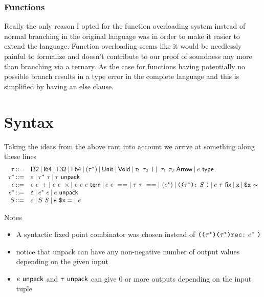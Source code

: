 \documentclass{article}
\begin{document}
\subsubsection{Functions}
Really the only reason I opted for the function overloading system instead of normal branching in the original language was in order to make it easier to extend the language.
Function overloading seems like it would be needlessly painful to formalize and doesn't contribute to our proof of soundness any more than branching via a ternary. As the case for functions having potentially no possible branch results in a type error in the complete language and this is simplified by having an else clause.

\section{Syntax}
Taking the ideas from the above rant into account we arrive at something along these lines
\[
\begin{array}{r l}
    \tau \mathop{::=} & \mathsf{I32} \mathbin{|} \mathsf{I64} \mathbin{|} \mathsf{F32} \mathbin{|} \mathsf{F64} \mathbin{|} 
        (\tau^*) \mathbin{|} \mathsf{Unit} \mathbin{|} \mathsf{Void} \mathbin{|} \tau_1~ \tau_2~ \texttt{|} 
        \mathbin{|} ~ \tau_1 ~ \tau_2 ~ \mathsf{Arrow} \mathbin{|} e ~ \mathsf{type}\\
        
    \tau^* \mathop{::=} & \varepsilon \mathbin{|} \tau^* ~ \tau \mathbin{|} \tau ~ \mathsf{unpack}\\

    e \mathop{::=} & e~e~+ \mathbin{|} ~e~e~\times \mathbin{|} ~ e ~ e ~ e ~ \mathsf{tern} 
        \mathbin{|} e~e~== \mathbin{|} ~ \tau~ \tau~ ==
        \mathbin{|} ~ ( e^* )
        \mathbin{|} \texttt{((} \tau^* \texttt{):} ~ S ~ \texttt{)} \mathbin{|} e ~ \tau ~ \mathsf{fix}
        \mathbin{|} \texttt{x} \mathbin{|} \texttt{\$x}~\mathsf{\thicksim}\\

    e^* \mathop{::=} & \varepsilon \mathbin{|} e^* ~ e \mathbin{|} e ~ \mathsf{unpack}\\
        
    S \mathop{::=} & \varepsilon \mathbin{|} S~ S \mathbin{|} e~ \texttt{\$x} = \mathbin{|} ~e

\end{array}
\]

Notes
\begin{itemize}
    \item A syntactic fixed point combinator was chosen instead of $\texttt{((} \tau^* \texttt{)(} \tau^* \texttt{)rec:} ~ e^* ~ \texttt{)}$
    \item notice that unpack can have any non-negative number of output values depending on the given input
    \item $e ~ \mathsf{unpack}$ and $\tau ~ \mathsf{unpack}$ can give 0 or more outputs depending on the input tuple
\end{itemize}
\end{document}

